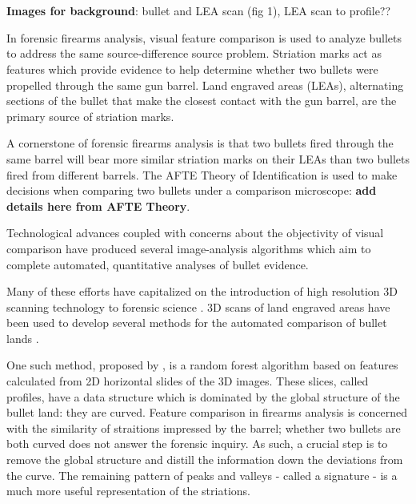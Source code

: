 \documentclass[12pt]{article}
\begin{document}
\\
 \\

\textbf{Images for background}: bullet and LEA scan (fig 1), LEA scan to
profile??

In forensic firearms analysis, visual feature comparison is used to
analyze bullets to address the same source-difference source problem.
Striation marks act as features which provide evidence to help determine
whether two bullets were propelled through the same gun barrel. Land
engraved areas (LEAs), alternating sections of the bullet that make the
closest contact with the gun barrel, are the primary source of striation
marks.

A cornerstone of forensic firearms analysis is that two bullets fired
through the same barrel will bear more similar striation marks on their
LEAs than two bullets fired from different barrels. The AFTE Theory of
Identification \citep{AFTE} is used to make decisions when comparing two
bullets under a comparison microscope: \textbf{add details here from
AFTE Theory}.

Technological advances coupled with concerns about the objectivity of
visual comparison have produced several image-analysis algorithms which
aim to complete automated, quantitative analyses of bullet evidence.

Many of these efforts have capitalized on the introduction of high
resolution 3D scanning technology to forensic science
\citep[see][]{DeKinder1, DeKinder2, Bachrach1}. 3D scans of land
engraved areas have been used to develop several methods for the
automated comparison of bullet lands
\citep[e.g.][]{Ma1, Chu1, Chu2, Hare1}.

One such method, proposed by \citet{Hare1}, is a random forest algorithm
based on features calculated from 2D horizontal slides of the 3D images.
These slices, called profiles, have a data structure which is dominated
by the global structure of the bullet land: they are curved. Feature
comparison in firearms analysis is concerned with the similarity of
straitions impressed by the barrel; whether two bullets are both curved
does not answer the forensic inquiry. As such, a crucial step is to
remove the global structure and distill the information down the
deviations from the curve. The remaining pattern of peaks and valleys -
called a signature - is a much more useful representation of the
striations.
\end{document}

